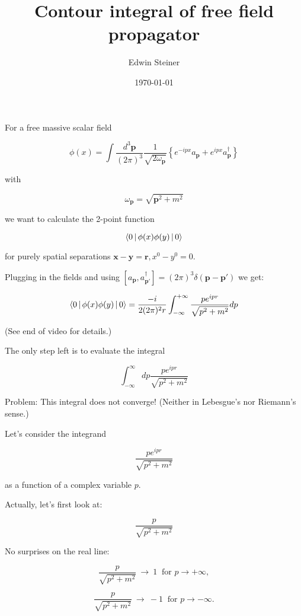 \documentclass{beamer}
\title{Contour integral of free field propagator}
\author{Edwin Steiner}
\date{\today}
\newcommand{\sqrtpm}{\sqrt{p^2 + m^2}}
\newcommand{\envelope}{\frac{p}{\sqrtpm}}
\newcommand{\integrand}{\frac{p e^{ipr}}{\sqrt{p^2 + m^2}}}
\newcommand{\vp}{\mathbf{p}}
\newcommand{\vx}{\mathbf{x}}
\newcommand{\vy}{\mathbf{y}}
\newcommand{\vr}{\mathbf{r}}
\newcommand{\vpp}{\mathbf{p}'}
\newcommand{\omvp}{\omega_{\vp}}
\newcommand{\ap}{a_{\vp}}
\newcommand{\adp}{a^\dagger_{\vp}}
\newcommand{\adpp}{a^\dagger_{\vpp}}
\newcommand{\intpthree}{\int \frac{d^3\vp}{(2\pi)^3}}
\newcommand{\com}[2]{[{#1},{#2}]}
\newcommand{\phixy}{\Braket{0|\phi(x)\phi(y)|0}}
\newcommand{\intii}{\int_{-\infty}^{+\infty}}
\begin{document}
\begin{frame}
\titlepage
\end{frame}


\begin{frame}
For a free massive scalar field

\pause
$$\phi(x) = \intpthree \frac{1}{\sqrt{2\omvp}} \left\{ e^{-ipx} \ap + e^{ipx} \adp \right\}$$

with

$$\omvp = \sqrt{\vp^2 + m^2}$$

\pause
we want to calculate the \alert{2-point function}

\pause
$$\phixy$$

\pause
for \alert{purely spatial} separations $\vx - \vy = \vr, x^0 - y^0 = 0$.

\end{frame}


\begin{frame}
Plugging in the fields and using $\com{\ap}{\adpp} = (2\pi)^3 \delta(\vp - \vpp)$ we get:

\pause
$$\phixy = \frac{-i}{2(2\pi)^2 r} \intii \frac{p e^{ipr}}{\sqrtpm} dp$$

\pause
(See end of video for details.)

\end{frame}



\begin{frame}
The only step left is to evaluate the integral

$$\int_{-\infty}^{\infty} dp \integrand$$

\pause
Problem: \alert{This integral does not converge!} (Neither in Lebesgue's
nor Riemann's sense.)
\end{frame}


\begin{frame}
Let's consider the integrand

$$\integrand$$

as a function of a \alert{complex} variable $p$.

\end{frame}


\begin{frame}
Actually, let's first look at:

$$\envelope$$

\pause
No surprises on the real line:

\pause
$$\envelope \ \rightarrow \ 1 \ \textrm{ for } p \rightarrow +\infty,$$

$$\envelope \ \rightarrow \ -1 \ \textrm{ for } p \rightarrow -\infty.$$

\end{frame}
\end{document}
